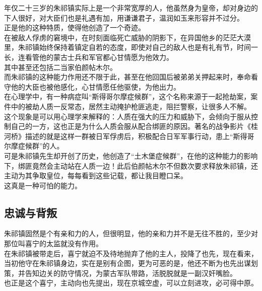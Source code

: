 \begin{multicols}{\theparacolNo}
年仅二十三岁的朱祁镇实际上是一个非常宽厚的人，他虽然身为皇帝，却对身边的下人很好，对大臣们也是礼遇有加，用谦谦君子，温润如玉来形容并不过分。\\

正是他的这种特质，使得他创造了一个奇迹。\\

在被敌人俘虏的窘境中，在时刻面临死亡威胁的阴影下，在异国他乡的茫茫大漠里，朱祁镇始终保持着镇定自若的态度，即使对自己的敌人也是有礼有节，时间一长，连看管他的蒙古士兵和军官都心甘情愿为他效力。\\

其中甚至还包括二当家伯颜帖木尔。\\

而朱祁镇的这种能力作用还不限于此，甚至在他回国后被弟弟关押起来时，奉命看守他的大臣也被他感化，心甘情愿任他驱使，为他出力。\\

在心理学中，有一种病症叫“斯得哥尔摩症候群”，这个名称来源于一起抢劫案，案件中的被劫人质一反常态，居然主动掩护枪匪逃走，阻拦警察，让很多人不解。\\

这个现象是可以用心理学来解释的：人质在强大的压力和威胁下，会倾向于服从控制自己的一方，这也正是为什么人质会服从配合绑匪的原因。著名的战争影片《桂河桥》描述的就是这样一群被日军俘虏后，积极配合日军军事行动，患上“斯得哥尔摩症候群”的人。\\

可是朱祁镇先生却开创了历史，他创造了“土木堡症候群”，在他的这种能力的影响下，绑匪竟然会主动站在人质一边！此后伯颜帖木尔不但数次要求释放朱祁镇，还主动为其争取皇位，每每看到这些记载，都让我目瞪口呆。\\

这真是一种可怕的能力。\\

\subsection{忠诚与背叛}
朱祁镇固然是个有亲和力的人，但很明显，他的亲和力并不是无往不胜的，至少对那位叫喜宁的太监就没有作用。\\

在朱祁镇被带走后，喜宁就迫不及待地抛弃了他的主人，投降了也先，现在看来，当初他守在朱祁镇身边，实在是别有企图，更为可恶的是，他还不断为也先出谋划策，并告知边关的防守情况，为蒙古军队带路，活脱脱就是一副汉奸嘴脸。\\

也正是这个喜宁，主动向也先提出，现在京城空虚，可以立刻进攻，必可得中原。\\


\end{multicols}
